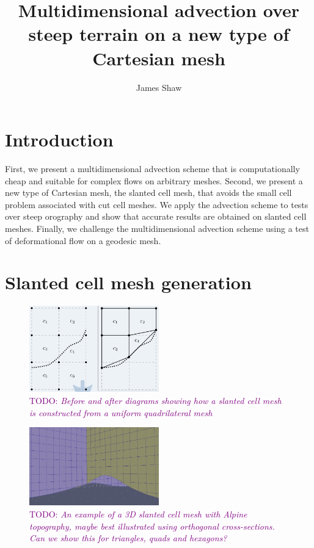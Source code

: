\documentclass{article}
\title{Multidimensional advection over steep terrain on a new type of Cartesian mesh \\ \TODO{(working title)}}
\author{James Shaw}
\newcommand{\TODO}[1]{\textcolor{purple}{TODO: \emph{#1}}}
\begin{document}
\maketitle

\section{Introduction}

First, we present a multidimensional advection scheme that is computationally cheap and suitable for complex flows on arbitrary meshes.  Second, we present a new type of Cartesian mesh, the slanted cell mesh, that avoids the small cell problem associated with cut cell meshes.   We apply the advection scheme to tests over steep orography and show that accurate results are obtained on slanted cell meshes.  Finally, we challenge the multidimensional advection scheme using a test of deformational flow on a geodesic mesh.

\section{Slanted cell mesh generation}

\begin{figure}
	\includegraphics[width=0.5\textwidth]{slantCellConstruction.png}
	\caption{\TODO{Before and after diagrams showing how a slanted cell mesh is constructed from a uniform quadrilateral mesh}}
\end{figure}

\begin{figure}
	\includegraphics[width=0.5\textwidth]{3dslices.png}
	\caption{\TODO{An example of a 3D slanted cell mesh with Alpine topography, maybe best illustrated using orthogonal cross-sections.  Can we show this for triangles, quads and hexagons?}}
\end{figure}
\end{document}

